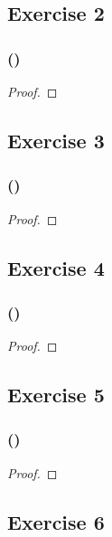 \documentclass[14pt]{extarticle}
\begin{document}
\subsection{Exercise 2}

\subsubsection{()}

\begin{proof}

\end{proof}

\subsection{Exercise 3}

\subsubsection{()}

\begin{proof}

\end{proof}

\subsection{Exercise 4}

\subsubsection{()}

\begin{proof}

\end{proof}

\subsection{Exercise 5}

\subsubsection{()}

\begin{proof}

\end{proof}

\subsection{Exercise 6}
\end{document}
